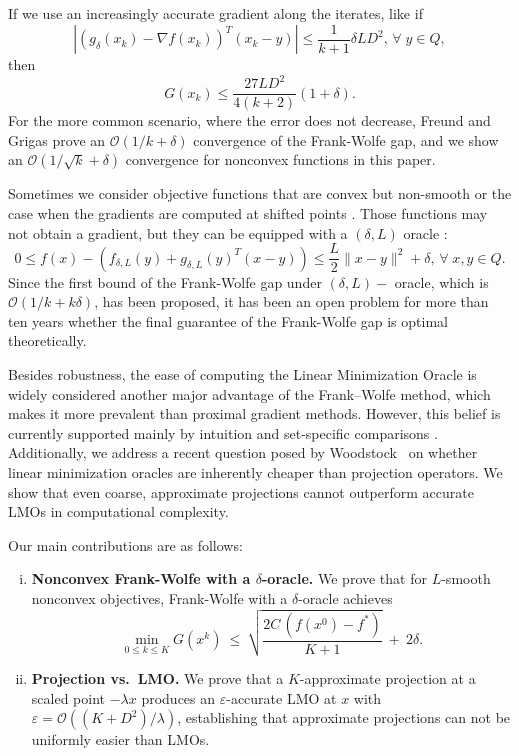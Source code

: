 \documentclass[smallextended]{svjour3}
\begin{document}
If we use an increasingly accurate gradient along the iterates, like if
\[\left|(g_{\delta}( x_k) - \nabla f( x_k))^T( x_k - y)\right| \leq \frac{1}{k + 1}\delta L D^2,\, \forall \; y \in Q,\]
then
\[G( x_k) \leq \frac{27LD^2}{4(k + 2)}(1 + \delta).\]
For the more common scenario, where the error does not decrease, Freund and Grigas prove an $\mathcal{O}(1/k + \delta)$ convergence of the Frank-Wolfe gap\cite{FreundGrigas2013}, and we show an $\mathcal{O}(1/\sqrt{k} + \delta)$ convergence for nonconvex functions in this paper. 

Sometimes we consider objective functions that are convex but non-smooth or the case when the gradients are computed at shifted points \cite{DevolderGlineurNesterov2013}. Those functions may not obtain a gradient, but they can be equipped with a $(\delta, L)$ oracle \cite{Devolder2014}:\[
0 \leq f( x) - (f_{\delta, L}(y) + g_{\delta, L}(y)^T( x - y)) \leq \frac{L}{2}\| x -y\|^2 + \delta,\, \forall \;  x, y \in Q.
\]
Since the first bound of the Frank-Wolfe gap under $(\delta, L)-$ oracle, which is $\mathcal{O}(1/k + k\delta)$, has been proposed\cite{FreundGrigas2013}, it has been an open problem for more than ten years whether the final guarantee of the Frank-Wolfe gap is optimal theoretically.

Besides robustness, the ease of computing the Linear Minimization Oracle is widely considered another major advantage of the Frank–Wolfe method, 
which makes it more prevalent than proximal gradient methods. 
However, this belief is currently supported mainly by intuition and set-specific comparisons 
\cite{CombettesPokutta2021,PokuttaIntro2024}. 
Additionally, we address a recent question posed by Woodstock~\cite{Woodstock2025} on whether linear minimization oracles are inherently cheaper than projection operators. We show that even coarse, approximate projections cannot outperform accurate LMOs in computational complexity.

Our main contributions are as follows:
\begin{enumerate}[(i)]
\item \textbf{Nonconvex Frank-Wolfe with a $\delta$-oracle.} We prove that for $L$-smooth nonconvex objectives, Frank-Wolfe with a $\delta$-oracle achieves
\[
\min_{0\le k\le K} G( x^k)\ \le\ \sqrt{\frac{2C\,(f( x^0)-f^*)}{K+1}}\ +\ 2\delta.
\]
\item \textbf{Projection vs.\ LMO.} We prove that a $K$-approximate projection at a scaled point $-\lambda x$ produces an $\varepsilon$-accurate LMO at $x$ with $\varepsilon=\mathcal{O}((K+D^2)/\lambda)$, establishing that approximate projections can not be uniformly easier than LMOs.
\end{enumerate}
\end{document}
